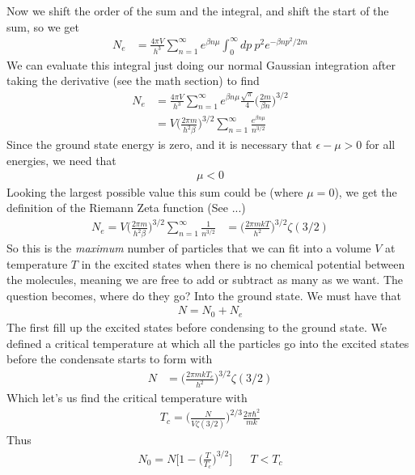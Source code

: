 Now we shift the order of the sum and the integral, and shift the start of the sum, so we get
\begin{align}
    N_e &= \frac{4\pi V}{h^3}\sum_{n=1}^\infty e^{\beta n\mu}\int_0^\infty dp~p^2  e^{-\beta n p^2/2m}
\end{align}
We can evaluate this integral just doing our normal Gaussian integration after taking the derivative (see the math section) to find
\begin{align}
    N_e &= \frac{4\pi V}{h^3}\sum_{n=1}^\infty e^{\beta n\mu} \frac{\sqrt{\pi}}{4}\Big(\frac{2m}{\beta n}\Big)^{3/2}\\
    &= V\Big(\frac{2\pi m}{h^2\beta}\Big)^{3/2}\sum_{n=1}^\infty \frac{e^{\beta n\mu}}{n^{3/2}}
\end{align}
Since the ground state energy is zero, and it is necessary that $\epsilon - \mu > 0$ for all energies, we need that
\begin{align}
    \mu < 0
\end{align}
Looking the largest possible value this sum could be (where $\mu = 0$), we get the definition of the Riemann Zeta function (See ...)
\begin{align}
    N_e = V\Big(\frac{2\pi m}{h^2\beta}\Big)^{3/2}\sum_{n=1}^\infty \frac{1}{n^{3/2}} &= \Big(\frac{2\pi m kT}{h^2}\Big)^{3/2} \zeta(3/2)
\end{align}
So this is the \emph{maximum} number of particles that we can fit into a volume $V$ at temperature $T$ in the excited states when there is no chemical potential between the molecules, meaning we are free to add or subtract as many as we want. The question becomes, where do they go? Into the ground state. We must have that 
\begin{align}
    N = N_0 + N_e
\end{align}
The first fill up the excited states before condensing to the ground state. We defined a critical temperature at which all the particles go into the excited states before the condensate starts to form with %
\begin{align}
    N &= \Big(\frac{2\pi m kT_c}{h^2}\Big)^{3/2} \zeta(3/2)
\end{align}
Which let's us find the critical temperature with
\begin{align}
    T_c = \Big(\frac{N}{V\zeta(3/2)}\Big)^{2/3} \frac{2\pi\hbar^2}{mk}
\end{align}
Thus
\begin{align}
    N_0 = N\Big[1-\Big(\frac{T}{T_c}\Big)^{3/2}\Big]&& T < T_c
\end{align}
